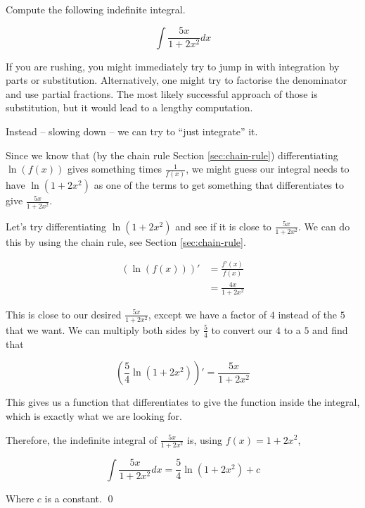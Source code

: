 \begin{example}
    Compute the following indefinite integral.

    \[ \int \frac{5x}{1+2x^2} dx\]
\end{example}
\begin{solution}
    If you are rushing, you might immediately try to jump in with integration by parts or substitution. Alternatively, one might try to factorise 
    the denominator and use partial fractions. The most likely successful approach of those is substitution, but it would lead to a lengthy computation.

    Instead -- slowing down -- we can try to ``just integrate'' it.

    Since we know that (by the chain rule Section \ref{sec:chain-rule}) differentiating $\ln(f(x))$ gives something times $\frac{1}{f(x)}$, we might guess our integral needs to 
    have $\ln(1+2x^2)$ as one of the terms to get something that differentiates to give $\frac{5x}{1+2x^2}$.

    Let's try differentiating $\ln(1+2x^2)$ and see if it is close to $\frac{5x}{1+2x^2}$. We can do this by using the chain rule, see Section \ref{sec:chain-rule}.

    \begin{align*}
        (\ln(f(x)))' &= \frac{f'(x)}{f(x)} \tag{using the chain rule}\\
         &= \frac{4x}{1+2x^2} \tag{using $f(x) = 1+2x^2$}
    \end{align*}

    This is close to our desired $\frac{5x}{1+2x^2}$, except we have a factor of $4$ instead of the $5$ that we want. 
    We can multiply both sides by $\frac{5}{4}$ to convert our $4$ to a $5$ and find that 

    \[ (\frac{5}{4}\ln(1+2x^2))' = \frac{5x}{1+2x^2}\]

    This gives us a function that differentiates to give the function inside the integral, which is exactly what we are looking for.

    Therefore, the indefinite integral of $\frac{5x}{1+2x^2}$ is, using $f(x) = 1+2x^2$,

    \[ \int \frac{5x}{1+2x^2} dx = \frac{5}{4}\ln(1+2x^2) + c\]
    
    Where $c$ is a constant.
    \qed
\end{solution}


